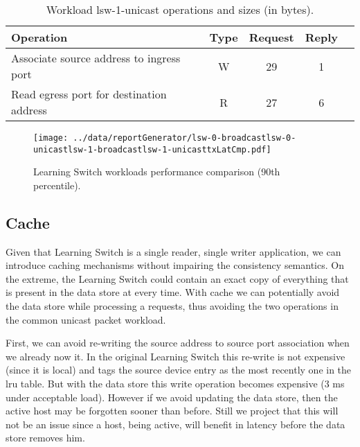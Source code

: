 \begin{table}[ht]
\small
\centering 
\begin{tabular}{l c c c c}
Operation & Type & Request & Reply \\ \toprule 
Associate source address to ingress port & W & 29 & 1\\
Read egress port for destination address & R & 27 & 6 \\ \bottomrule
\end{tabular}
\caption[Workload lsw-1-unicast operations]{Workload lsw-1-unicast operations and sizes (in bytes).}
\label{table:lsw1:unicast}
\end{table}

\begin{figure}[ht]
\centering
\texttt{[image: ../data/reportGenerator/lsw-0-broadcastlsw-0-unicastlsw-1-broadcastlsw-1-unicasttxLatCmp.pdf]}
\caption[Learning Switch workloads performance comparison]{Learning
  Switch workloads performance comparison (90th percentile). }
\label{fig:lsw:comparison}
\end{figure}

\subsection{Cache}
\label{sec:ls:cache}
Given that Learning Switch is a single reader, single writer application, we can introduce caching mechanisms without impairing the consistency semantics. 
On the extreme, the Learning Switch could contain an exact copy of everything that is present in the data store at every time.  
With cache we can potentially avoid the data store while processing a requests, thus avoiding the two operations in the common unicast packet workload. 

First, we can avoid re-writing the source address to source port association when we already now it. 
In the original Learning Switch this re-write is not expensive (since it is local) and tags the source device  entry as the most recently one in the \gls{lru} table. 
But with the data store this write operation becomes expensive (3 ms under acceptable load).
However if we avoid updating the data store, then the active host may be forgotten sooner than before. Still we project that this will not be an issue since a host, being active, will benefit in latency before the data store removes him. %

